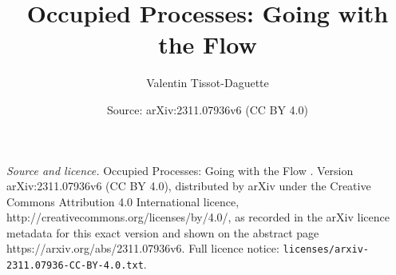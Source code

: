 \documentclass[10pt,a4paper]{amsart}
\title{\vspace{-10mm} Occupied Processes: Going with the Flow \vspace{-3mm}}
\author{Valentin Tissot-Daguette}
\date{Source: arXiv:2311.07936v6 (CC BY 4.0)}
\begin{document}
\maketitle

\noindent\emph{Source and licence.} \vspace{-10mm} Occupied Processes: Going with the Flow \vspace{-3mm}. Version arXiv:2311.07936v6 (CC BY 4.0), distributed by arXiv under the Creative Commons Attribution 4.0 International licence, http://creativecommons.org/licenses/by/4.0/, as recorded in the arXiv licence metadata for this exact version and shown on the abstract page https://arxiv.org/abs/2311.07936v6. Full licence notice: \texttt{licenses/arxiv-2311.07936-CC-BY-4.0.txt}.\par\smallskip
\end{document}
